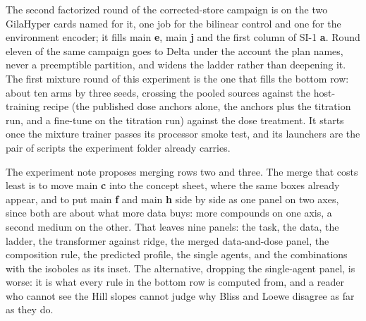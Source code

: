  The second factorized
round of the corrected-store campaign is on the two GilaHyper cards named for it, one job
for the bilinear control and one for the environment encoder; it fills main \textbf{e},
main \textbf{j} and the first column of SI-1 \textbf{a}. Round eleven of the same
campaign goes to Delta under the account the plan names, never a preemptible partition,
and widens the ladder rather than deepening it. The first mixture round of this
experiment is the one that fills the bottom row: about ten arms by three seeds, crossing
the pooled sources against the host-training recipe (the published dose anchors alone, the
anchors plus the titration run, and a fine-tune on the titration run) against the dose
treatment. It starts once the mixture trainer passes its processor smoke test, and its
launchers are the pair of scripts the experiment folder already carries.

 The experiment note proposes merging rows two
and three. The merge that costs least is to move main \textbf{c} into the concept sheet,
where the same boxes already appear, and to put main \textbf{f} and main \textbf{h} side
by side as one panel on two axes, since both are about what more data buys: more
compounds on one axis, a second medium on the other. That leaves nine panels: the task,
the data, the ladder, the transformer against ridge, the merged data-and-dose panel, the
composition rule, the predicted profile, the single agents, and the combinations with the
isoboles as its inset. The alternative, dropping the single-agent panel, is worse: it is
what every rule in the bottom row is computed from, and a reader who cannot see the Hill
slopes cannot judge why Bliss and Loewe disagree as far as they do.
